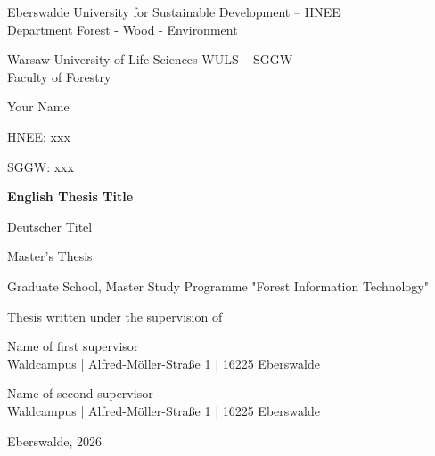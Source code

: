 \begin{center}
    {\fontsize{16}{19}\selectfont Eberswalde University for Sustainable Development -- HNEE\\
Department Forest - Wood - Environment}

\vspace{1cm}

{\fontsize{16}{19}\selectfont Warsaw University of Life Sciences WULS -- SGGW\\
Faculty of Forestry}

\vspace{2cm}

{\fontsize{14}{17}\selectfont Your Name \par} %
{\fontsize{12}{15}\selectfont HNEE: xxx \par} %
{\fontsize{12}{15}\selectfont SGGW: xxx \par} %

\vspace{1.5cm}

{\fontsize{24}{24}\selectfont\textbf{English Thesis Title}\par} %
\vspace{0.5cm}
{\fontsize{16}{19}\selectfont Deutscher Titel \par} %
\vspace{1.5cm}
{\fontsize{14}{17}\selectfont Master's Thesis \par}
{\fontsize{14}{17}\selectfont Graduate School, Master Study Programme "Forest Information Technology"}
    
\end{center}

\vspace{1cm}

\begin{flushright}
Thesis written under the supervision of

\vspace*{0.5cm}

Name of first supervisor \\ %
Waldcampus | Alfred-Möller-Straße 1 | 16225 Eberswalde %

\vspace*{0.5cm}

Name of second supervisor \\ %
Waldcampus | Alfred-Möller-Straße 1 | 16225 Eberswalde %

\end{flushright}

\vspace*{1cm}

\begin{center}
    Eberswalde, 2026 %
\end{center}